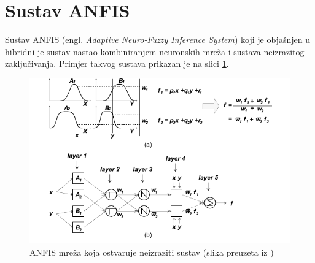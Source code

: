 \documentclass[12pt, a4paper, numeric]{article}
\begin{document}
\tableofcontents
\listoffigures
\pagebreak

\section{Sustav ANFIS}
Sustav ANFIS (engl. \textit{Adaptive Neuro-Fuzzy Inference System}) koji je objašnjen u \cite{nenr} hibridni je sustav nastao kombiniranjem neuronskih mreža i sustava neizrazitog zaključivanja.
Primjer takvog sustava prikazan je na slici \ref{fig:anfis}.
\begin{figure}[ht!] 
    \centering
    \includegraphics[width=.8\textwidth]{img/anfis}
    \captionsetup{justification=centering}
    \caption{ANFIS mreža koja ostvaruje neizraziti sustav  (slika preuzeta iz \cite{nenr})}
    \label{fig:anfis}
\end{figure}
\end{document}

